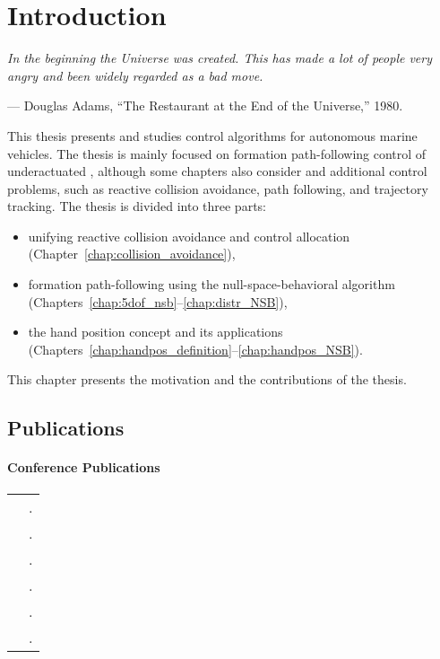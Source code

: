 \chapter{Introduction}
\label{chap:introduction}

\setlength{\epigraphwidth}{0.5\textwidth}
\epigraph{ \it
    In the beginning the Universe was created.
    This has made a lot of people very angry and been widely regarded as a bad move.
}{--- Douglas Adams, ``The Restaurant at the End of the Universe,'' 1980.}

This thesis presents and studies control algorithms for autonomous marine vehicles.
The thesis is mainly focused on formation path-following control of underactuated , although some chapters also consider  and additional control problems, such as reactive collision avoidance, path following, and trajectory tracking.
The thesis is divided into three parts:
\begin{itemize}
    \item unifying reactive collision avoidance and control allocation (Chapter~\ref{chap:collision_avoidance}),
    \item formation path-following using the null-space-behavioral algorithm (Chapters~\ref{chap:5dof_nsb}--\ref{chap:distr_NSB}),
    \item the hand position concept and its applications (Chapters~\ref{chap:handpos_definition}--\ref{chap:handpos_NSB}).
\end{itemize}
This chapter presents the motivation and the contributions of the thesis.





\section{Publications}
\newcommand{\tablecite}[1]{\cite{#1} & \fullcite{#1}.}

\subsubsection{Conference Publications}
\begin{tabularx}{\textwidth}{rX}
    \tablecite{matous_unifying_2021} \\
    \tablecite{matouvs_formation_2022} \\
    \tablecite{matouvs_formation_2022} \\
    \tablecite{matous_singularity_2023} \\
    \tablecite{matous_MPC_2022} \\
    \tablecite{restrepo_formation_2022}
\end{tabularx}

